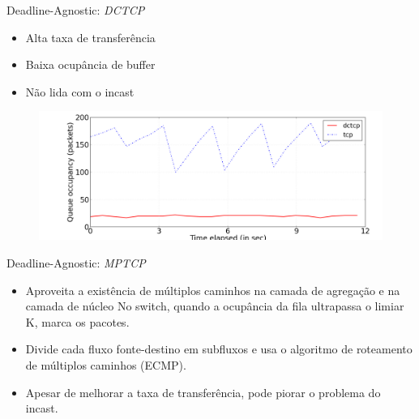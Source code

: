 \documentclass[aspectratio=169]{beamer}
\begin{document}
	\begin{frame} {Deadline-Agnostic: \textit{DCTCP}}
	    \Large
	    \begin{itemize}
	                           
	    \item
	      Alta taxa de transferência
	    \item
	      Baixa ocupância de buffer
	    \item
	      Não lida com o incast
	  
		\end{itemize}      
	    \begin{figure}[ht]    
	        \includegraphics[scale=0.3]{imagens/dctcp_tcp_queue.png}
	    \end{figure}
	        
	
	    
	\end{frame}  


	
	\begin{frame} {Deadline-Agnostic: \textit{MPTCP}}
	                
	
	    \Large
	    \begin{itemize}
	                           
	        \item
	            Aproveita a existência de múltiplos caminhos na camada de agregação e na camada de núcleo        
	            No switch, quando a ocupância da fila ultrapassa o limiar K, marca os pacotes.
	        \item
	            Divide cada fluxo fonte-destino em subfluxos e usa o algoritmo de roteamento de múltiplos caminhos (ECMP).
	        \item
	            Apesar de melhorar a taxa de transferência, pode piorar o problema do incast.
	
	    \end{itemize}
	  
	\end{frame}
	  
\end{document}
